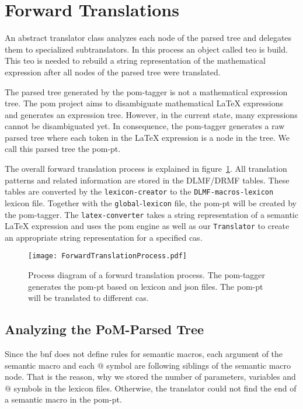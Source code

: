 \section{Forward Translations}\label{sec:forward-translation}
An abstract translator class analyzes each node of the parsed tree and delegates them to specialized subtranslators. In this process an object called \gls*{teo} is build. This \gls*{teo} is needed to rebuild a string representation of the mathematical expression after all nodes of the parsed tree were translated.

The parsed tree generated by the \gls*{pom}-tagger is not a mathematical expression tree. The \gls*{pom} project aims to disambiguate mathematical \LaTeX{} expressions and generates an expression tree. However, in the current state, many expressions cannot be disambiguated yet. In consequence, the \gls*{pom}-tagger generates a raw parsed tree where each token in the \LaTeX{} expression is a node in the tree. We call this parsed tree the \gls*{pom-pt}.

{\sloppy The overall forward translation process is explained in figure~\ref{fig:forward-trans}. All translation patterns and related information are stored in the DLMF/DRMF tables. These tables are converted by the \verb|lexicon-creator| to the \verb|DLMF-macros-lexicon| lexicon file. Together with the \verb|global|-\verb|lexicon| file, the \gls*{pom-pt} will be created by the \gls*{pom}-tagger. The \verb|latex-converter| takes a string representation of a semantic \LaTeX{} expression and uses the \gls*{pom} engine as well as our \verb|Translator| to create an appropriate string representation for a specified \gls*{cas}.}

\begin{figure}[ht]
	\vspace{-10pt}
	\centering
	\texttt{[image: ForwardTranslationProcess.pdf]}
	\caption{Process diagram of a forward translation process. The \gls*{pom}-tagger generates the \gls*{pom-pt} based on lexicon and \gls*{json} files. The \gls*{pom-pt} will be translated to different \gls*{cas}.}
	\label{fig:forward-trans}
	\vspace{-10pt}
\end{figure}

\subsection{Analyzing the PoM-Parsed Tree}\label{subsec:analyze-mlp}
Since the \gls*{bnf} does not define rules for semantic macros, each argument of the semantic macro and each $@$ symbol are following siblings of the semantic macro node. That is the reason, why we stored the number of parameters, variables and $@$ symbols in the lexicon files. Otherwise, the translator could not find the end of a semantic macro in the \gls*{pom-pt}.

